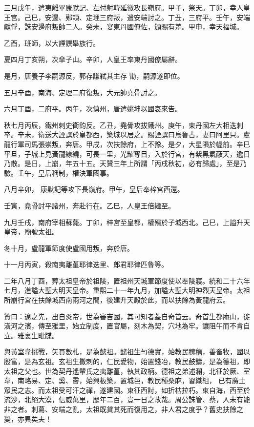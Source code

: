\begin{pinyinscope}
 三月戊午，遣夷離畢康默記、左付射韓延徽攻長嶺府。甲子，祭天。丁卯，幸人皇王宮。己巳，安邊、鄚頡、定理三府叛，遣安端討之。丁丑，三府平。壬午，安端獻俘，誅安邊府叛帥二人。癸未，宴東丹國僚佐，頒賜有差。甲申，幸天福城。



 乙酉，班師，以大諲譔舉族行。



 夏四月丁亥朔，次傘子山。辛卯，人皇王率東丹國僚屬辭。



 是月，唐養子李嗣源反，郭存謙弒其主存
 勖，嗣源遂即位。



 五月辛酉，南海、定理二府復叛，大元帥堯骨討之。



 六月丁酉，二府平。丙午，次慎州，唐遣姚坤以國哀來告。



 秋七月丙辰，鐵州刺史衛鈞反。乙丑，堯骨攻拔鐵州。庚午，東丹國左大相迭刺卒。辛未，衛送大諲譔於皇都西，築城以居之。賜諲譔曰烏魯古，妻曰阿里只。盧龍行軍司馬張崇叛，奔唐。甲戌，次扶餘府，上不豫。是夕，大星隕於幄前。辛巳平旦，子城上見黃龍繚繞，可長一里，光耀奪目，入於行宮，有紫黑氣蔽天，逾日乃散。是日，上崩，年五十五。天贊三年上所謂「丙戌秋初，必有歸處」，至是乃驗。壬午，皇后稱制，權決軍國事。



 八月辛卯，
 康默記等攻下長嶺府。甲午，皇后奉梓宮西還。



 壬寅，堯骨討平諸州，奔赴行在。乙巳，人皇王倍繼至。



 九月壬戌，南府宰相蘇薨。丁卯，梓宮至皇都，權殯於子城西北。己巳，上謚升天皇帝，廟號太祖。



 冬十月，盧龍軍節度使盧國用叛，奔於唐。



 十一月丙寅，殺南夷離堇耶律迭里、郎君耶律匹魯等。



 二年八月丁酉，葬太祖皇帝於祖陵，置祖州天城軍節度使以奉陵寢。統和二十六年七月，進謚大聖大明天皇帝。重熙二十一年九月，加謚大聖大明神烈天皇帝。太祖所崩行宮在扶餘城西南雨河之間，後建升天殿於此，而以扶餘為黃龍府云。



 贊曰：遼之先，出自炎帝，世為審吉國，其可知者蓋自奇首云。奇首生都庵山，徙潢河之濱，傳至雅里，始立制度，置官屬，刻木為契，穴地為牢。讓阻午而不肯自立。雅裏生毗牒。



 與黃室韋挑戰，矢貫數札，是為懿祖。懿祖生勻德實，始教民稼穡，善畜牧，國以殷富，是為玄祖。玄祖生撒刺的，仁民愛物，始置錢冶，教民鼓鑄，是為德祖，即太祖之父也。世為契丹遙輦氏之夷離堇，執其政柄。德祖之弟述瀾，北征於厥、室韋，南略易、定、奚、霫，始興板築，置城邑，教民種桑麻，習織組，
 已有廣土眾民之志。而太祖受可汗之禪，遂建國。東征西討，如折枯拉朽。東自海，西至於流沙，北絕大漠，信威萬里，歷年二百，豈一日之故哉。周公誅管、蔡，人未有能非之者。刺葛、安端之亂，太祖既貸其死而復用之，非人君之度乎？舊史扶餘之變，亦異矣夫！



\end{pinyinscope}